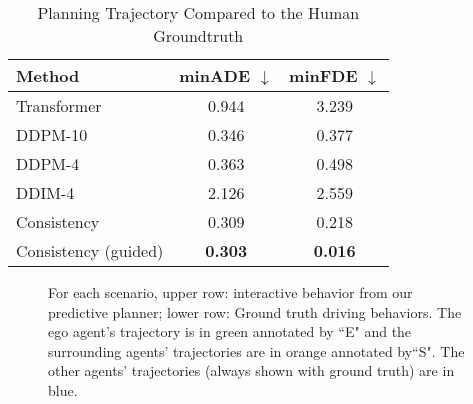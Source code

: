 \begin{table}[t]
    \centering
    \caption{Planning Trajectory Compared to the Human Groundtruth}
    \label{tab:prediction metrics}
    \begin{tabular}{lcc}
    \toprule
    Method & minADE $\downarrow$ & minFDE $\downarrow$ \\
    \midrule
    Transformer & 0.944 & 3.239 \\
    \midrule
    DDPM-10 & 0.346 & 0.377 \\
    DDPM-4 & 0.363 & 0.498  \\
    DDIM-4 & 2.126 &  2.559 \\
    Consistency & 0.309 &  0.218 \\
    Consistency (guided) & \textbf{0.303} & \textbf{0.016} \\
    \bottomrule
    \end{tabular}
\end{table}


\begin{figure*}[!t]
    \centering
    \vspace{0.1em}  %
    \caption{For each scenario, upper row: interactive behavior from our predictive planner; 
    lower row: Ground truth driving behaviors.
    The ego agent's trajectory is in green annotated by ``E" and the surrounding agents' trajectories are in orange annotated by``S".
    The other agents' trajectories (always shown with ground truth) are in blue.}
    \label{fig: interactive behavior}
\end{figure*}

